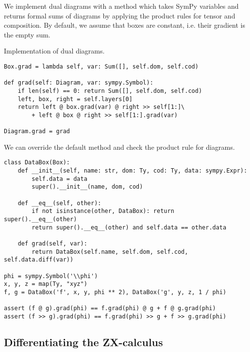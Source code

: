 We implement dual diagrams with a method  which takes SymPy variables and returns formal sums of diagrams by applying the product rules for tensor and composition.
By default, we assume that boxes are constant, i.e. their gradient is the empty sum.

\begin{python}
{\normalfont Implementation of dual diagrams.}

\begin{verbatim}
Box.grad = lambda self, var: Sum([], self.dom, self.cod)

def grad(self: Diagram, var: sympy.Symbol):
    if len(self) == 0: return Sum([], self.dom, self.cod)
    left, box, right = self.layers[0]
    return left @ box.grad(var) @ right >> self[1:]\
        + left @ box @ right >> self[1:].grad(var)

Diagram.grad = grad
\end{verbatim}
\end{python}

\begin{example}
We can override the default  method and check the product rule for diagrams.

\begin{verbatim}
class DataBox(Box):
    def __init__(self, name: str, dom: Ty, cod: Ty, data: sympy.Expr):
        self.data = data
        super().__init__(name, dom, cod)

    def __eq__(self, other):
        if not isinstance(other, DataBox): return super().__eq__(other)
        return super().__eq__(other) and self.data == other.data

    def grad(self, var):
        return DataBox(self.name, self.dom, self.cod, self.data.diff(var))

phi = sympy.Symbol('\\phi')
x, y, z = map(Ty, "xyz")
f, g = DataBox('f', x, y, phi ** 2), DataBox('g', y, z, 1 / phi)

assert (f @ g).grad(phi) == f.grad(phi) @ g + f @ g.grad(phi)
assert (f >> g).grad(phi) == f.grad(phi) >> g + f >> g.grad(phi)
\end{verbatim}
\end{example}

\subsection{Differentiating the ZX-calculus}\label{2b-differentiating-zx}

